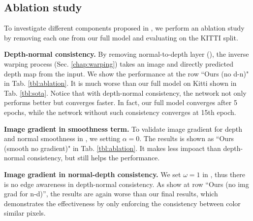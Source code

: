 


\vspace{-0.6\baselineskip}
\subsection{Ablation study}
\vspace{-0.3\baselineskip}
To investigate different components proposed in , we perform an ablation study by removing each one from our full model and evaluating on the KITTI split.

\textbf{Depth-normal consistency.} By removing normal-to-depth layer (), the inverse warping process (Sec. \ref{chap:warping}) takes an image and directly predicted depth map from the input. We show the performance at the row ``Ours (no d-n)" in Tab. \ref{tbl:ablation}. It is much worse than our full model on Kitti shown in Tab. \ref{tbl:sota}.
Notice that with depth-normal consistency, the network not only performs better but converges faster. In fact, our full model converges after 5 epochs, while the network without such consistency converges at 15th epoch.

\textbf{Image gradient in smoothness term.} To validate image gradient for depth and normal smoothness in , 
we setting $\alpha=0$. The results is shown as ``Ours (smooth no gradient)" in Tab. \ref{tbl:ablation}. It makes less impoact than depth-normal consistency, but still helps the performance.

\textbf{Image gradient in normal-depth consistency.} We set $\omega=1$ in , thus there is no edge awareness in depth-normal consistency. As show at row ``Ours (no img grad for n-d)'', the results are again worse than our final results, which demonstrates the effectiveness by only enforcing the consistency between color similar pixels. %

